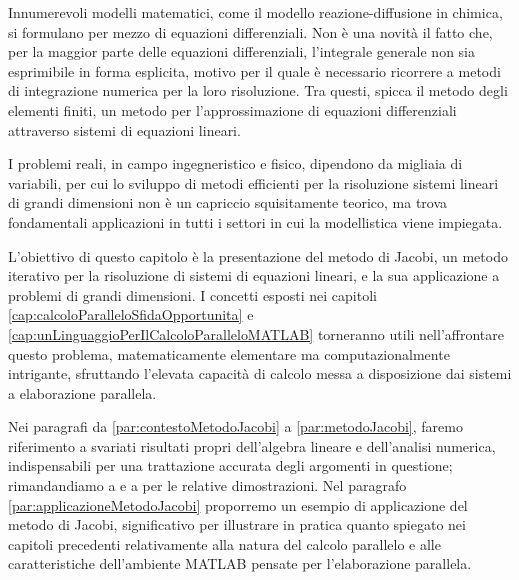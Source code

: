 Innumerevoli modelli matematici, come il modello reazione-diffusione in chimica, si formulano per mezzo di equazioni 
differenziali. \newline
Non \`e una novit\`a il fatto che, per la maggior parte delle equazioni differenziali, l'integrale generale non sia esprimibile in forma esplicita, motivo per il quale \`e 
necessario ricorrere a metodi di integrazione numerica per la loro risoluzione.\newline
Tra questi, spicca il metodo degli elementi finiti, un metodo per l'approssimazione di equazioni differenziali 
attraverso sistemi di equazioni lineari.

I problemi reali, in campo ingegneristico e fisico, dipendono da migliaia di variabili, per cui lo sviluppo di metodi efficienti per la risoluzione sistemi lineari di grandi 
dimensioni non \`e un capriccio squisitamente teorico, ma trova fondamentali applicazioni in tutti i settori in cui la modellistica viene impiegata.

L'obiettivo di questo capitolo \`e la presentazione del metodo di Jacobi, un metodo iterativo per la risoluzione di sistemi di equazioni lineari, e la sua 
applicazione a problemi di grandi dimensioni.\newline
I concetti esposti nei capitoli \ref{cap:calcoloParalleloSfidaOpportunita} e \ref{cap:unLinguaggioPerIlCalcoloParalleloMATLAB} torneranno utili nell'affrontare questo problema, matematicamente elementare ma computazionalmente 
intrigante, sfruttando l'elevata capacit\`a di calcolo messa a disposizione dai sistemi a elaborazione parallela.

Nei paragrafi da \ref{par:contestoMetodoJacobi} a \ref{par:metodoJacobi}, faremo riferimento a svariati risultati propri dell'algebra lineare e dell'analisi numerica, indispensabili per una trattazione accurata degli 
argomenti in questione; rimandandiamo a \cite{Betti2000} e a \cite{Quarteroni2000} per le relative dimostrazioni.\newline
Nel paragrafo \ref{par:applicazioneMetodoJacobi} proporremo un esempio di applicazione del metodo di Jacobi, 
significativo per illustrare in pratica quanto spiegato nei capitoli precedenti relativamente alla natura del calcolo parallelo 
e alle caratteristiche dell'ambiente MATLAB pensate per l'elaborazione parallela.